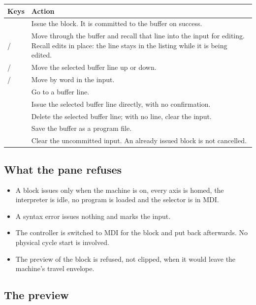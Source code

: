 \begin{longtable}{L{4.4cm}L{8.4cm}}
  \toprule
  \textbf{Keys} & \textbf{Action} \\
  \midrule
  \endhead
   & Issue the block. It is committed to the buffer on success. \\
  \keycap{\textuparrow} / \keycap{\textdownarrow} & Move through the buffer and recall that line into the input for
        editing. Recall edits in place: the line stays in the listing while it is being
        edited. \\
   /  & Move the selected buffer line up or down. \\
   /  & Move by word in the input. \\
   & Go to a buffer line. \\
   & Issue the selected buffer line directly, with no confirmation. \\
   & Delete the selected buffer line; with no line,
        clear the input. \\
   & Save the buffer as a program file. \\
   & Clear the uncommitted input. An already issued block is not cancelled. \\
  \bottomrule
\end{longtable}

\subsection*{What the pane refuses}

\begin{itemize}
  \item A block issues only when the machine is on, every axis is homed, the interpreter is
        idle, no program is loaded and the selector is in MDI.
  \item A syntax error issues nothing and marks the input.
  \item The controller is switched to MDI for the block and put back afterwards. No physical
        cycle start is involved.
  \item The preview of the block is refused, not clipped, when it would leave the machine's
        travel envelope.
\end{itemize}

\subsection*{The preview}

